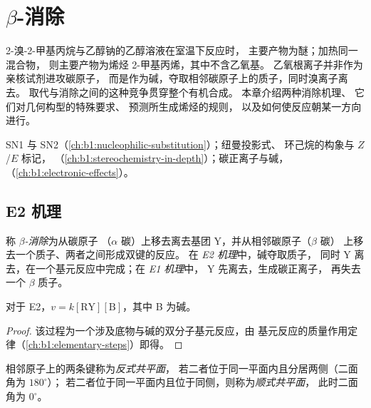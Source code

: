 \chapter{\texorpdfstring{$\beta$}{贝塔}-消除}\label{ch:b1:elimination}

2-溴-2-甲基丙烷与乙醇钠的乙醇溶液在室温下反应时，
主要产物为醚；加热同一混合物，
则主要产物为烯烃 2-甲基丙烯，其中不含乙氧基。
乙氧根离子并非作为亲核试剂进攻碳原子，
而是作为碱，夺取相邻碳原子上的质子，同时溴离子离去。
取代与消除之间的这种竞争贯穿整个有机合成。
本章介绍两种消除机理、
它们对几何构型的特殊要求、
预测所生成烯烃的规则，
以及如何使反应朝某一方向进行。

\begin{recall}
SN1 与 SN2（\cref{ch:b1:nucleophilic-substitution}）；纽曼投影式、
环己烷的构象与 $Z$/$E$ 标记，
（\cref{ch:b1:stereochemistry-in-depth}）；碳正离子与碱，
（\cref{ch:b1:electronic-effects}）。
\end{recall}

\section{E2 机理}

\begin{definition}\label{def:b1:elimination:elimination}
称 \emph{$\beta$-消除}为从碳原子
（$\alpha$ 碳）上移去离去基团 Y，并从相邻碳原子（$\beta$ 碳）
上移去一个质子、两者之间形成双键的反应。
在 \emph{E2 机理}中，碱夺取质子，
同时 Y 离去，在一个基元反应中完成；在 \emph{E1 机理}中，
Y 先离去，生成碳正离子，
再失去一个 $\beta$ 质子。
\end{definition}

\begin{proposition}[E2 的速率方程]\label{prop:b1:elimination:e2-law}
对于 E2，$v = k[\mathrm{RY}][\mathrm{B}]$，其中 B 为碱。
\end{proposition}

\begin{proof}
该过程为一个涉及底物与碱的双分子基元反应，由
基元反应的质量作用定律（\cref{ch:b1:elementary-steps}）即得。
\end{proof}

\begin{definition}[反式与顺式共平面]\label{def:b1:elimination:periplanar}
相邻原子上的两条键称为\emph{反式共平面}，
若二者位于同一平面内且分居两侧（二面角为 $180^\circ$）；
若二者位于同一平面内且位于同侧，则称为\emph{顺式共平面}，
此时二面角为 $0^\circ$。
\end{definition}

